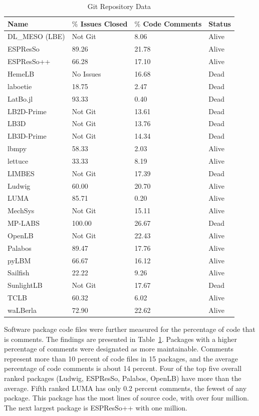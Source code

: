 \documentclass[final, 3p, times, authoryear]{elsarticle}
\begin{document}
\begin{table}
	\begin{center}
		\begin{tabular}{ p{3.5cm}p{3.5cm}p{3.5cm}p{2.5cm} }
			\hline
			Name & $\%$ Issues Closed & $\%$ Code Comments & Status\\
			\hline
			DL\_MESO (LBE) & Not Git & 8.06& Alive\\
			ESPResSo & 89.26 & 21.78 & Alive\\
			ESPResSo++ & 66.28 & 17.10 & Alive\\
			HemeLB & No Issues & 16.68 & Dead\\
			laboetie & 18.75 & 2.47 & Dead\\		
			LatBo.jl & 93.33 & 0.40 & Dead\\
			LB2D-Prime & Not Git & 13.61 & Dead\\
			LB3D & Not Git & 13.76 & Dead\\
			LB3D-Prime & Not Git & 14.34 & Dead\\
			lbmpy& 58.33  & 2.03 & Alive\\
			lettuce & 33.33 & 8.19 & Alive\\
			LIMBES & Not Git & 17.39 & Dead\\
			Ludwig& 60.00 & 20.70 & Alive\\
			LUMA& 85.71   & 0.20 & Alive\\
			MechSys & Not Git & 15.11 & Alive\\
			MP-LABS & 100.00 & 26.67 & Dead\\
			OpenLB & Not Git & 22.43 & Alive\\
			Palabos & 89.47 & 17.76 & Alive\\
			pyLBM & 66.67& 16.12 & Alive\\
			Sailfish & 22.22 & 9.26 & Alive\\
			SunlightLB & Not Git & 17.67 & Dead\\
			TCLB & 60.32 & 6.02 & Alive\\
			waLBerla & 72.90 & 22.62 & Alive\\
			\hline
		\end{tabular}
		\caption{Git Repository Data} \label{gitrepodata}
	\end{center}
	\end{table}
		
Software package code files were further measured for the percentage of code
that is comments. The findings are presented in Table~\ref{gitrepodata}.
Packages with a higher percentage of comments were designated as more
maintainable. Comments represent more than 10 percent of code files in 15
packages, and the average percentage of code comments is about 14 percent. Four
of the top five overall ranked packages (Ludwig, ESPResSo, Palabos, OpenLB) have
more than the average. Fifth ranked LUMA has only 0.2 percent comments, the
fewest of any package. This package has the most lines of source code, with over
four million. The next largest package is ESPResSo++ with one million.
\end{document}
